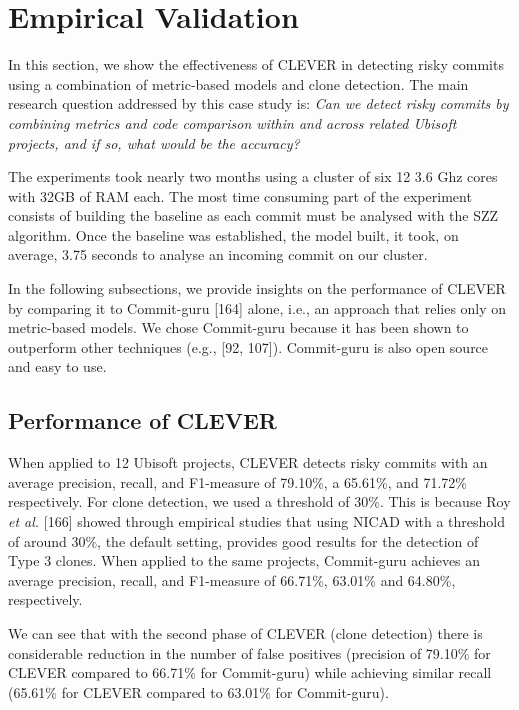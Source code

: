 \documentclass[12pt]{report}
\begin{document}
\section{Empirical Validation}\label{sec:result-bianca}

In this section, we show the effectiveness of CLEVER in detecting risky
commits using a combination of metric-based models and clone detection.
The main research question addressed by this case study is: \emph{Can we
detect risky commits by combining metrics and code comparison within and
across related Ubisoft projects, and if so, what would be the accuracy?}

The experiments took nearly two months using a cluster of six 12 3.6 Ghz
cores with 32GB of RAM each. The most time consuming part of the
experiment consists of building the baseline as each commit must be
analysed with the SZZ algorithm. Once the baseline was established, the
model built, it took, on average, 3.75 seconds to analyse an incoming
commit on our cluster.

In the following subsections, we provide insights on the performance of
CLEVER by comparing it to Commit-guru {[}164{]} alone, i.e., an approach
that relies only on metric-based models. We chose Commit-guru because it
has been shown to outperform other techniques (e.g., {[}92, 107{]}).
Commit-guru is also open source and easy to use.

\subsection{Performance of CLEVER}\label{performance-of-clever}

When applied to 12 Ubisoft projects, CLEVER detects risky commits with
an average precision, recall, and F1-measure of 79.10\%, a 65.61\%, and
71.72\% respectively. For clone detection, we used a threshold of 30\%.
This is because Roy \emph{et al.} {[}166{]} showed through empirical
studies that using NICAD with a threshold of around 30\%, the default
setting, provides good results for the detection of Type 3 clones. When
applied to the same projects, Commit-guru achieves an average precision,
recall, and F1-measure of 66.71\%, 63.01\% and 64.80\%, respectively.

We can see that with the second phase of CLEVER (clone detection) there
is considerable reduction in the number of false positives (precision of
79.10\% for CLEVER compared to 66.71\% for Commit-guru) while achieving
similar recall (65.61\% for CLEVER compared to 63.01\% for Commit-guru).
\end{document}
